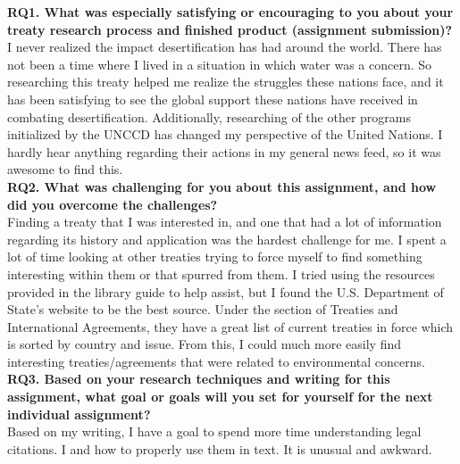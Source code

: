 \documentclass[12pt]{article}
\begin{document}

\textbf{RQ1. What was especially satisfying or encouraging to you about your treaty research process and finished product (assignment submission)? } \\

I never realized the impact desertification has had around the world. There has not been a time where I lived in a situation in which water was a concern. So researching this treaty helped me realize the struggles these nations face, and it has been satisfying to see the global support these nations have received in combating desertification. Additionally, researching of the other programs initialized by the UNCCD has changed my perspective of the United Nations. I hardly hear anything regarding their actions in my general news feed, so it was awesome to find this. \\

\textbf{RQ2. What was challenging for you about this assignment, and how did you overcome the challenges?} \\

Finding a treaty that I was interested in, and one that had a lot of information regarding its history and application was the hardest challenge for me. I spent a lot of time looking at other treaties trying to force myself to find something interesting within them or that spurred from them. I tried using the resources provided in the library guide to help assist, but I found the U.S. Department of State's website to be the best source. Under the section of Treaties and International Agreements, they have a great list of current treaties in force which is sorted by country and issue. From this, I could much more easily find interesting treaties/agreements that were related to environmental concerns.  \\

\textbf{RQ3. Based on your research techniques and writing for this assignment, what goal or goals will you set for yourself for the next individual assignment?} \\

Based on my writing, I have a goal to spend more time understanding legal citations. I and how to properly use them in text. It is unusual and awkward. 

\newpage
\printbibliography
\end{document}
